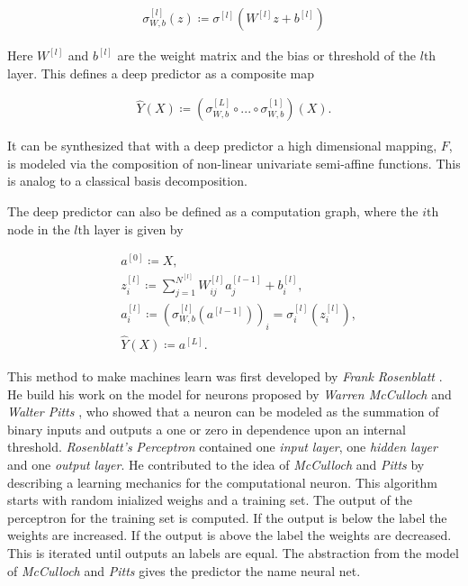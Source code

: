 \documentclass[12pt, a4paper]{thesis}
\begin{document}
\begin{align}
\sigma^{[l]}_{W,b}(z) \coloneqq \sigma^{[l]}\left(W^{[l]} z + b^{[l]} \right)
\end{align}

Here \(W^{[l]}\) and \(b^{[l]}\) are the weight matrix and the bias or threshold of
the \(l\text{th}\) layer.  This defines a deep predictor as a composite map

\begin{align}
\hat{Y}(X) \coloneqq \left( \sigma^{[L]}_{W,b} \circ ... \circ \sigma^{[1]}_{W,b}  \right) (X).
\end{align}

It can be synthesized that with a deep predictor a high dimensional mapping, \(F\), is
modeled via the composition of non-linear univariate semi-affine functions. This
is analog to a classical basis decomposition.

The deep predictor can also be defined as a computation graph, where the
\(i\text{th}\) node in the \(l\text{th}\) layer is given by

\begin{align}
&a^{[0]} \coloneqq X, \\
&z^{[l]}_{i} \coloneqq \sum_{j=1}^{N^{[l]}} W^{[l]}_{ij} a^{[l-1]}_{j} + b^{[l]}_{i}, \label{z-def}\\
&a^{[l]}_{i} \coloneqq \left(\sigma^{[l]}_{W,b}(a^{[l-1]})\right)_{i} = \sigma^{[l]}_{i}(z^{[l]}_{i}), \label{forward}\\
&\hat{Y}(X) \coloneqq a^{[L]}.
\end{align}

This method to make machines learn was first developed by \emph{Frank
  Rosenblatt} \cite{rosenblatt58_percep}. He build his work on the
model for neurons proposed by \emph{Warren McCulloch} and \emph{Walter
  Pitts} \cite{mcculloch43}, who showed that a neuron can be modeled
as the summation of binary inputs and outputs a one or zero in
dependence upon an internal threshold. \emph{Rosenblatt's}
\emph{Perceptron} contained one \emph{input layer}, one \emph{hidden
  layer} and one \emph{output layer}. He contributed to the idea of
\emph{McCulloch} and \emph{Pitts} by describing a learning mechanics
for the computational neuron. This algorithm starts with random
inialized weighs and a training set. The output of the perceptron for
the training set is computed. If the output is below the label the
weights are increased. If the output is above the label the weights
are decreased. This is iterated until outputs an labels are equal. The
abstraction from the model of \emph{McCulloch} and \emph{Pitts} gives
the predictor the name neural net.
\end{document}
